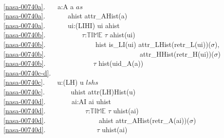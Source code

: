 {\mnewfoil
\bp
{} \\
\ref{nasa-00740a}.\ \ \ {\ALL} a:A {\RDOT} a {\ISIN} $as$ {\DBLRIGHTARROW}\ \ \ \ \\
\ref{nasa-00740a}.\ \ \ \ \ \  ahist {\EQ} attr\_AHist(a) \ \ \\
\ref{nasa-00740a}.\ \ \ \ \ \ {\ALL} ui:(LI{\BAR}HI) {\RDOT} ui {\ISIN}  ahist {\DBLRIGHTARROW}\ \ \ \\
\ref{nasa-00740b}.\ \ \ \ \ \ \ \ \ \ {\ALL} $\tau$:$\mathbb{TIME}$ {\RDOT} $\tau$ {\ISIN}  ahist(ui) {\DBLRIGHTARROW}\ \ \ \\
\ref{nasa-00740b}.\ \ \ \ \ \ \ \ \ \ \ \ \ \  hist {\EQ} is\_LI(ui) {\RIGHTARROW} attr\_LHist(retr\_L(ui))($\sigma$), \\
\ref{nasa-00740b}.\ \ \ \ \ \ \ \ \ \ \ \ \ \ \ \ \ \ \ \ \ \ \ \ \ \ \ {\UNDERLINE} {\RIGHTARROW} attr\_HHist(retr\_H(ui))($\sigma$) \\
\ref{nasa-00740b}.\ \ \ \ \ \ \ \ \ \ \ \ \ \ $\tau$ {\ISIN}  hist(uid\_A(a))  \\
\ref{nasa-00740c-d}.\ \ \ \ {\WEDGE}\\
\ref{nasa-00740c}.\ \ \ {\ALL} u:(L{\BAR}H) {\RDOT} u {\ISIN} $ls${\UNION}$hs$ {\DBLRIGHTARROW} \\
\ref{nasa-00740c}.\ \ \ \ \ \ \  uhist {\EQ} attr(L{\BAR}H)Hist(u) \\
\ref{nasa-00740d}.\ \ \ \ \ \ \ {\ALL} ai:AI {\RDOT} ai {\ISIN}  uhist {\DBLRIGHTARROW}\\
\ref{nasa-00740d}.\ \ \ \ \ \ \ \ \ \ \ {\ALL} $\tau$:$\mathbb{TIME}$ {\RDOT} $\tau$ {\ISIN}  uhist(ai) {\DBLRIGHTARROW}\\
\ref{nasa-00740d}.\ \ \ \ \ \ \ \ \ \ \ \ \ \ \  ahist {\EQ} attr\_AHist(retr\_A(ai))($\sigma$) \\
\ref{nasa-00740d}.\ \ \ \ \ \ \ \ \ \ \ \ \ \ \ $\tau$ {\ISIN}  uhist(ai)  
\ep
}

